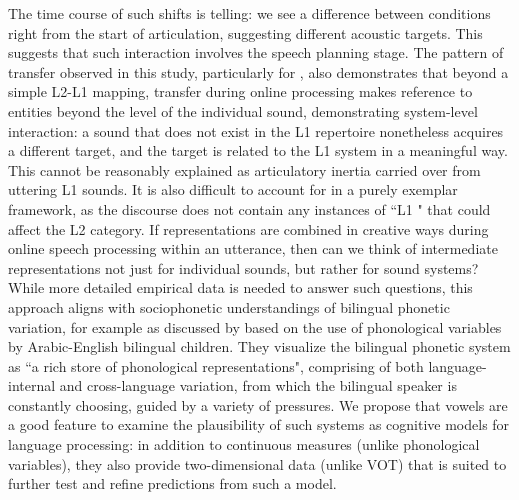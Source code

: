 \documentclass[12 pt]{article}
\newcommand{\nt}[1]{\textipa{[#1]}} %
\begin{document}
The time course of such shifts is telling: we see a difference between conditions right from the start of articulation, suggesting different acoustic targets. This suggests that such interaction involves the speech planning stage. The pattern of transfer observed in this study, particularly for \nt{2}, also demonstrates that beyond a simple L2-L1 mapping, transfer during online processing makes reference to entities beyond the level of the individual sound, demonstrating system-level interaction: a sound that does not exist in the L1 repertoire nonetheless acquires a different target, and the target is related to the L1 system in a meaningful way. This cannot be reasonably explained as articulatory inertia carried over from uttering L1 sounds. It is also difficult to account for in a purely exemplar framework, as the discourse does not contain any instances of ``L1 \nt{2}" that could affect the L2 category. If representations are combined in creative ways during online speech processing within an utterance, then can we think of intermediate representations not just for individual sounds, but rather for sound systems? While more detailed empirical data is needed to answer such questions, this approach aligns with sociophonetic understandings of bilingual phonetic variation, for example as discussed by \cite{khattab2009phonetic,khattab2013phonetic} based on the use of phonological variables by Arabic-English bilingual children. They visualize the bilingual phonetic system as ``a rich store of phonological representations", comprising of both language-internal and cross-language variation, from which the bilingual speaker is constantly choosing, guided by a variety of pressures. We propose that vowels are a good feature to examine the plausibility of such systems as cognitive models for language processing: in addition to continuous measures (unlike phonological variables), they also provide two-dimensional data (unlike VOT) that is suited to further test and refine predictions from such a model.
\end{document}
